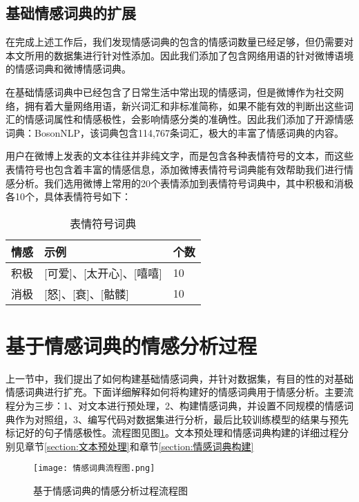 \subsection{基础情感词典的扩展}
在完成上述工作后，我们发现情感词典的包含的情感词数量已经足够，但仍需要对本文所用的数据集进行针对性添加。因此我们添加了包含网络用语的针对微博语境的情感词典和微博情感词典。

在基础情感词典中已经包含了日常生活中常出现的情感词，但是微博作为社交网络，拥有着大量网络用语，新兴词汇和非标准简称，如果不能有效的判断出这些词汇的情感词属性和情感极性，会影响情感分类的准确性。因此我们添加了开源情感词典：BosonNLP\cite{boson}，该词典包含114,767条词汇，极大的丰富了情感词典的内容。

用户在微博上发表的文本往往并非纯文字，而是包含各种表情符号的文本，而这些表情符号也包含着丰富的情感信息\cite{中文微博情感分析}，添加微博表情符号词典能有效帮助我们进行情感分析。我们选用微博上常用的20个表情添加到表情符号词典中，其中积极和消极各10个，具体表情符号如下：
\begin{table}[htbp]
\begin{center}
\caption{表情符号词典}
\label{tab:biaoqing}
\begin{tabularx}{\linewidth}{ZZZ}\toprule
情感 & 示例 & 个数 \\\midrule
积极 & [可爱]、[太开心]、[嘻嘻]& 10\\
消极 & [怒]、[衰]、[骷髅]& 10\\\bottomrule
\end{tabularx}
\end{center}
\end{table}

\section{基于情感词典的情感分析过程}
上一节中，我们提出了如何构建基础情感词典，并针对数据集，有目的性的对基础情感词典进行扩充。下面详细解释如何将构建好的情感词典用于情感分析。主要流程分为三步：1、对文本进行预处理，2、构建情感词典，并设置不同规模的情感词典作为对照组，3、编写代码对数据集进行分析，最后比较训练模型的结果与预先标记好的句子情感极性。流程图见图\ref{fig:情感词典流程图}。文本预处理和情感词典构建的详细过程分别见章节\ref{section:文本预处理}和章节\ref{section:情感词典构建}
\begin{figure}[htbp]
\begin{center}
\texttt{[image: 情感词典流程图.png]}\\
\end{center}
\caption{基于情感词典的情感分析过程流程图}
\label{fig:情感词典流程图}
\end{figure}

